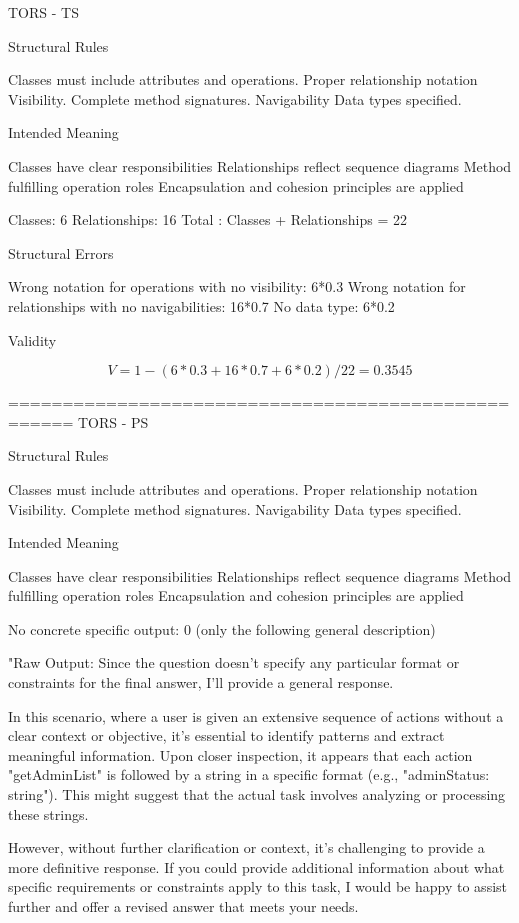 TORS - TS

Structural Rules

Classes must include attributes and operations.
Proper relationship notation 
Visibility.
Complete method signatures.
Navigability
Data types specified.

Intended Meaning

Classes have clear responsibilities
Relationships reflect sequence diagrams
Method fulfilling operation roles
Encapsulation and cohesion principles are applied

Classes:  6 
Relationships: 16
Total : Classes + Relationships = 22

Structural Errors

Wrong notation for operations with no visibility: 6*0.3
Wrong notation for relationships with no navigabilities: 16*0.7
No data type: 6*0.2

Validity

$$
V = 1 -(6*0.3+16*0.7+6*0.2)/22= 0.3545
$$

====================================================
TORS - PS

Structural Rules

Classes must include attributes and operations.
Proper relationship notation 
Visibility.
Complete method signatures.
Navigability
Data types specified.

Intended Meaning

Classes have clear responsibilities
Relationships reflect sequence diagrams
Method fulfilling operation roles
Encapsulation and cohesion principles are applied

No concrete specific output: 0 (only the following general description)

"Raw Output: Since the question doesn't specify any particular format or constraints for the final answer, I'll provide a general response.


In this scenario, where a user is given an extensive sequence of actions without a clear context or objective, it's essential to identify patterns and extract meaningful information. Upon closer inspection, it appears that each action "getAdminList" is followed by a string in a specific format (e.g., "adminStatus: string"). This might suggest that the actual task involves analyzing or processing these strings.


However, without further clarification or context, it's challenging to provide a more definitive response. If you could provide additional information about what specific requirements or constraints apply to this task, I would be happy to assist further and offer a revised answer that meets your needs.


